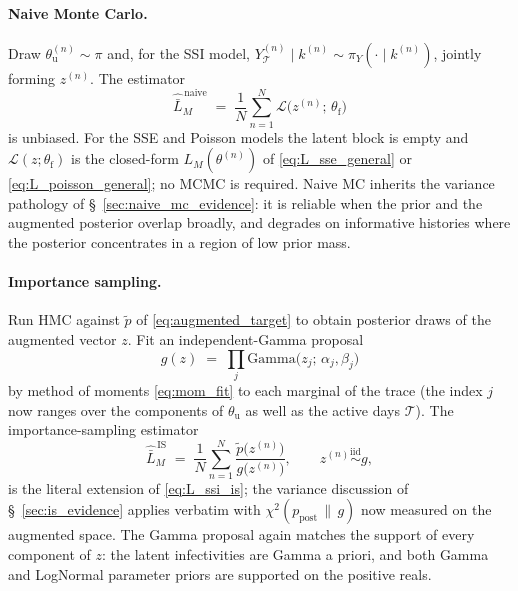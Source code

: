 \documentclass{article}
\theoremstyle{definition}
\begin{document}
\paragraph{Naive Monte Carlo.}  Draw
\(\theta_{\mathrm u}^{(n)} \sim \pi\) and, for the SSI model,
\(Y_{\mathcal T}^{(n)} \mid k^{(n)} \sim \pi_Y(\cdot \mid k^{(n)})\),
jointly forming \(z^{(n)}\).  The estimator
\begin{equation}\label{eq:L_naive_param}
  \widehat{\bar L}_M^{\,\mathrm{naive}}
  \;=\; \frac{1}{N}\sum_{n=1}^N
        \mathcal L\!\bigl(z^{(n)};\, \theta_{\mathrm f}\bigr)
\end{equation}
is unbiased.  For the SSE and Poisson models the latent block is empty
and \(\mathcal L(z; \theta_{\mathrm f})\) is the closed-form
\(L_M(\theta^{(n)})\) of \eqref{eq:L_sse_general} or
\eqref{eq:L_poisson_general}; no MCMC is required.  Naive MC inherits
the variance pathology of \S~\ref{sec:naive_mc_evidence}: it is reliable
when the prior and the augmented posterior overlap broadly, and degrades
on informative histories where the posterior concentrates in a region of
low prior mass.

\paragraph{Importance sampling.}  Run HMC against \(\tilde p\) of
\eqref{eq:augmented_target} to obtain posterior draws of the augmented
vector \(z\).  Fit an independent-Gamma proposal
\begin{equation}\label{eq:gamma_proposal_param}
  g(z) \;=\; \prod_j \mathrm{Gamma}\!\bigl(z_j;\, \alpha_j, \beta_j\bigr)
\end{equation}
by method of moments \eqref{eq:mom_fit} to each marginal of the trace
(the index \(j\) now ranges over the components of \(\theta_{\mathrm u}\)
as well as the active days \(\mathcal T\)).  The importance-sampling
estimator
\begin{equation}\label{eq:L_is_param}
  \widehat{\bar L}_M^{\,\mathrm{IS}}
  \;=\; \frac{1}{N}\sum_{n=1}^N
        \frac{\tilde p\!\bigl(z^{(n)}\bigr)}{g\!\bigl(z^{(n)}\bigr)},
  \qquad z^{(n)} \stackrel{\mathrm{iid}}{\sim} g,
\end{equation}
is the literal extension of \eqref{eq:L_ssi_is}; the variance
discussion of \S~\ref{sec:is_evidence} applies verbatim with
\(\chi^2(p_{\mathrm{post}} \,\|\, g)\) now measured on the augmented
space.  The Gamma proposal again matches the support of every
component of \(z\): the latent infectivities are Gamma a priori, and
both Gamma and LogNormal parameter priors are supported on the
positive reals.
\end{document}
